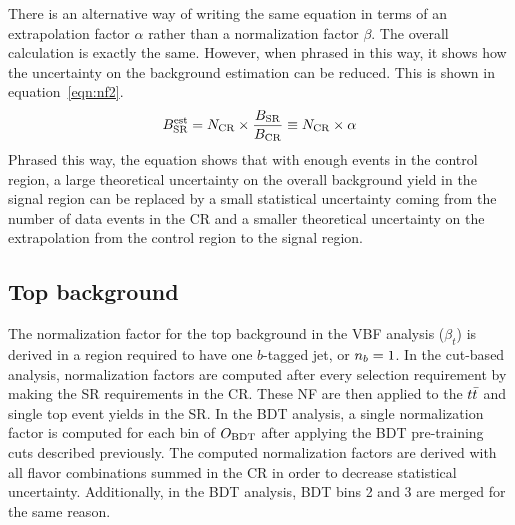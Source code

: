 There is an alternative way of writing the same equation in terms of an extrapolation factor $\alpha$ rather than a normalization factor $\beta$. The overall calculation is exactly the same. However, when phrased in this way, it shows how the uncertainty on the background estimation can be reduced. This is shown in equation~\ref{eqn:nf2}.
%
\begin{equation}
B_{\rm SR}^{\rm est} = N_{\rm CR} \times \frac{B_{\rm SR}}{B_{\rm CR}} \equiv N_{\rm CR} \times \alpha
\label{eqn:nf2}
\end{equation}
%
Phrased this way, the equation shows that with enough events in the control region, a large theoretical uncertainty on the overall background yield in the signal region can be replaced by a small statistical uncertainty coming from the number of data events in the CR and a smaller theoretical uncertainty on the extrapolation from the control region to the signal region. 

\subsection{Top background}
\label{sec:topnf}
The normalization factor for the top background in the VBF analysis ($\beta_{t}$) is derived in a region required to have one $b$-tagged jet, or $n_b = 1$. In the cut-based analysis, normalization factors are computed after every selection requirement by making the SR requirements in the CR. These NF are then applied to the $t\bar{t}$ and single top event yields in the SR. In the BDT analysis, a single normalization factor is computed for each bin of $O_{\rm BDT}$ after applying the BDT pre-training cuts described previously. The computed normalization factors are derived with all flavor combinations summed in the CR in order to decrease statistical uncertainty. Additionally, in the BDT analysis, BDT bins 2 and 3 are merged for the same reason.

